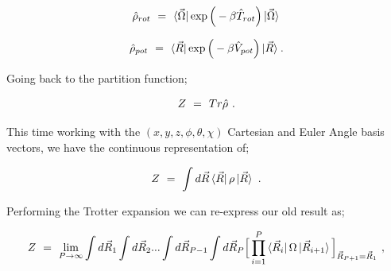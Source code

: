 \documentclass{article}
\begin{document}
\begin{equation} \label{eb-eq-1-231}
\hat{\rho}_{rot} \hspace{0.125cm} = \hspace{0.125cm} \bra{\vec{\Omega}} \exp \Big( - \beta \hat{T}_{rot} \Big) \ket{\vec{\Omega}} \hspace{0.025cm} 
\end{equation}

\begin{equation} \label{eb-eq-1-232}
\hat{\rho}_{pot} \hspace{0.125cm} = \hspace{0.125cm} \bra{\vec{R}} \exp \Big( - \beta \hat{V}_{pot} \Big) \ket{\vec{R}} \hspace{0.025cm} .
\end{equation}

Going back to the partition function;

\begin{equation} \label{eb-eq-1-233}
Z \hspace{0.125cm} = \hspace{0.125cm} Tr\hat{\rho} \hspace{0.125cm} .
\end{equation}

This time working with the \begin{math} (x, y, z, \phi, \theta, \chi) \end{math} Cartesian and Euler Angle basis vectors, we have the continuous representation of;

\begin{equation} \label{eb-eq-1-234}
Z \hspace{0.125cm} = \hspace{0.125cm} \int d \vec{R} \bra{\vec{R}} \rho \ket{\vec{R}} \hspace{0.125cm} .
\end{equation}

Performing the Trotter expansion we can re-express our old result as;

\begin{equation} \label{eb-eq-1-235}
Z \hspace{0.125cm} = \hspace{0.125cm}  \lim_{P \rightarrow \infty} \int d \vec{R}_1 \int d \vec{R}_2 ... \int d \vec{R}_{P - 1} \int d \vec{R}_P \Big[ \prod_{i=1}^{P} \bra{\vec{R}_i} \Omega \ket{\vec{R}_{i+1}} \Big]_{\vec{R}_{P+1} = \vec{R}_1} \hspace{0.125cm} , 
\end{equation}
\end{document}
